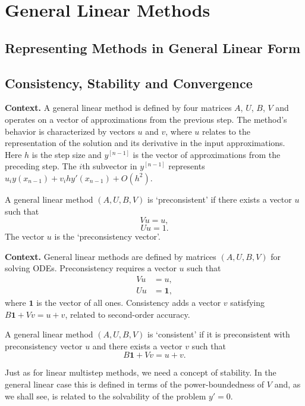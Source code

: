 \chapter{General Linear Methods}

\section{Representing Methods in General Linear Form}


\section{Consistency, Stability and Convergence}

\noindent\textbf{Context.}
A general linear method is defined by four matrices $A$, $U$, $B$, $V$ and operates on a vector of approximations from the previous step. The method's behavior is characterized by vectors $u$ and $v$, where $u$ relates to the representation of the solution and its derivative in the input approximations. Here $h$ is the step size and $y^{[n-1]}$ is the vector of approximations from the preceding step. The $i$th subvector in $y^{[n-1]}$ represents $u_i y(x_{n-1}) + v_i h y'(x_{n-1}) + O(h^2)$.

\begin{definition}

  \label{def:510A}
A general linear method $(A, U, B, V)$ is `preconsistent' if there exists a vector $u$ such that
\[
V u = u, \tag{510a}
\]
\[
U u = 1. \tag{510b}
\]
The vector $u$ is the `preconsistency vector'.
\end{definition}

\noindent\textbf{Context.}
General linear methods are defined by matrices $(A,U,B,V)$ for solving ODEs. Preconsistency requires a vector $u$ such that
\begin{align}
V u &= u, \tag{510a}\\
U u &= \mathbf{1}, \tag{510b}
\end{align}
where $\mathbf{1}$ is the vector of all ones. Consistency adds a vector $v$ satisfying $B\mathbf{1} + V v = u + v$, related to second-order accuracy.

\begin{definition}

  \label{def:510B}
A general linear method $(A, U, B, V)$ is `consistent' if it is preconsistent with preconsistency vector $u$ and there exists a vector $v$ such that
\[
B\mathbf{1} + V v = u + v. \tag{510c}
\]

Just as for linear multistep methods, we need a concept of stability. In the general linear case this is defined in terms of the power-boundedness of $V$ and, as we shall see, is related to the solvability of the problem $y' = 0$.
\end{definition}


